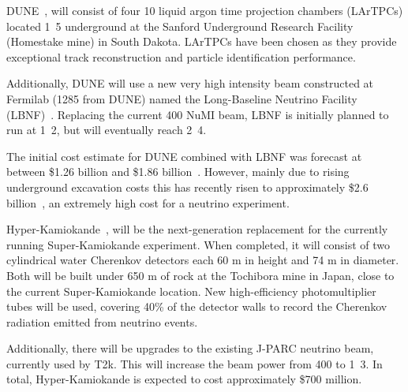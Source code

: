 DUNE~\cite{acciarri2016, abi2020}, will consist of four \unit{10}{} liquid argon time
projection chambers (LArTPCs) located \unit{1.5}{} underground at the Sanford
Underground Research Facility (Homestake mine) in South Dakota. LArTPCs have been chosen as they
provide exceptional track reconstruction and particle identification performance.

Additionally, DUNE will use a new very high intensity beam constructed at Fermilab
(\unit{1285}{} from DUNE) named the Long-Baseline Neutrino Facility
(LBNF)~\cite{acciarri2016_lbnf}. Replacing the current \unit{400}{} NuMI beam, LBNF is
initially planned to run at \unit{1.2}{}, but will eventually reach
\unit{2.4}{}.

The initial cost estimate for DUNE combined with LBNF was forecast at between \$1.26 billion and
\$1.86 billion~\cite{dune_cost}. However, mainly due to rising underground excavation costs this
has recently risen to approximately \$2.6 billion~\cite{aip_budget}, an extremely high cost for a
neutrino experiment.

Hyper-Kamiokande~\cite{abe2011,hyper_dr,hyperkamiok2014}, will be the next-generation replacement
for the currently running Super-Kamiokande experiment. When completed, it will consist of two
cylindrical water Cherenkov detectors each 60 m in height and 74 m in diameter. Both will be built
under 650 m of rock at the Tochibora mine in Japan, close to the current Super-Kamiokande
location. New high-efficiency photomultiplier tubes will be used, covering 40\% of the detector
walls to record the Cherenkov radiation emitted from neutrino events.

Additionally, there will be upgrades to the existing J-PARC neutrino beam, currently used by T2k.
This will increase the beam power from \unit{400}{} to \unit{1.3}{}. In
total, Hyper-Kamiokande is expected to cost approximately \$700 million.